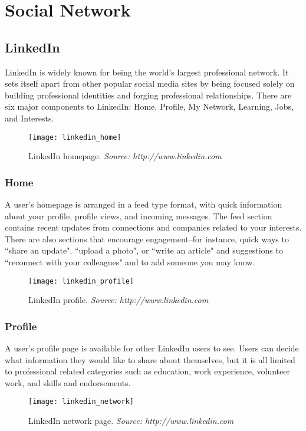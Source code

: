 \section{Social Network}
\subsection{LinkedIn}
LinkedIn is widely known for being the world's largest professional network. \cite{LinkedIn} It sets itself apart from other popular social media sites by being focused solely on building professional identities and forging professional relationships. There are six major components to LinkedIn: Home, Profile, My Network, Learning, Jobs, and Interests.

\begin{figure}[h]
\centering
\texttt{[image: linkedin\_home]}
\caption{LinkedIn homepage. \textit{Source: http://www.linkedin.com}}
\end{figure}

\subsubsection{Home}
A user's homepage is arranged in a feed type format, with quick information about your profile, profile views, and incoming messages. The feed section contains recent updates from connections and companies related to your interests. There are also sections that encourage engagement--for instance, quick ways to ``share an update", ``upload a photo", or ``write an article" and suggestions to ``reconnect with your colleagues" and to add someone you may know. 

\begin{figure}[h]
\centering
\texttt{[image: linkedin\_profile]}
\caption{LinkedIn profile. \textit{Source: http://www.linkedin.com}}
\end{figure}
\subsubsection{Profile}
A user's profile page is available for other LinkedIn users to see. Users can decide what information they would like to share about themselves, but it is all limited to professional related categories such as education, work experience, volunteer work, and skills and endorsements. 

\begin{figure}[h]
\centering
\texttt{[image: linkedin\_network]}
\caption{LinkedIn network page. \textit{Source: http://www.linkedin.com}}
\end{figure}

